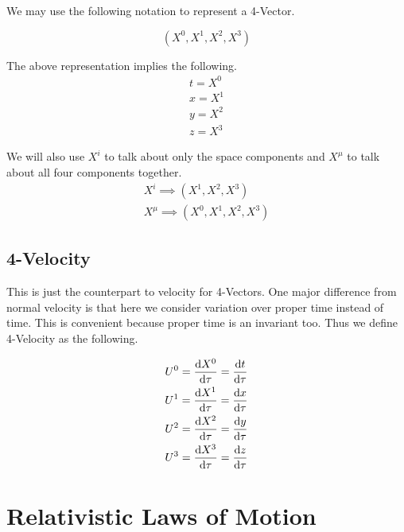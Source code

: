 \documentclass[12pt]{article}
\numberwithin{equation}{section}
\theoremstyle{plain}
\theoremstyle{definition}
\begin{document}
We may use the following notation to represent a 4-Vector.

\begin{equation}
    (X^0, X^1, X^2, X^3)
    \label{eq:4-vector}
\end{equation}

The above representation implies the following.
\begin{gather}
    t = X^0\\
    x = X^1\\
    y = X^2\\
    z = X^3
    \label{eq:4-vector-comps}
\end{gather}

We will also use $X^i$ to talk about only the space components and $X^\mu$ to talk about all four components together.
\begin{gather}
    X^i \implies (X^1, X^2, X^3)\\
    X^\mu \implies (X^0, X^1, X^2, X^3)
    \label{eq:4-vec-notation}
\end{gather}

\subsection{4-Velocity}

This is just the counterpart to velocity for 4-Vectors. One major difference from normal velocity is that here we consider variation over proper time instead of time. This is convenient because proper time is an invariant too. Thus we define 4-Velocity as the following.

\begin{gather}
    U^0 = \dv{X^0}{\tau} = \dv{t}{\tau}\\
    U^1 = \dv{X^1}{\tau} = \dv{x}{\tau}\\
    U^2 = \dv{X^2}{\tau} = \dv{y}{\tau}\\
    U^3 = \dv{X^3}{\tau} = \dv{z}{\tau}
    \label{eq:4-velocity}
\end{gather}

\section{Relativistic Laws of Motion}
\end{document}

